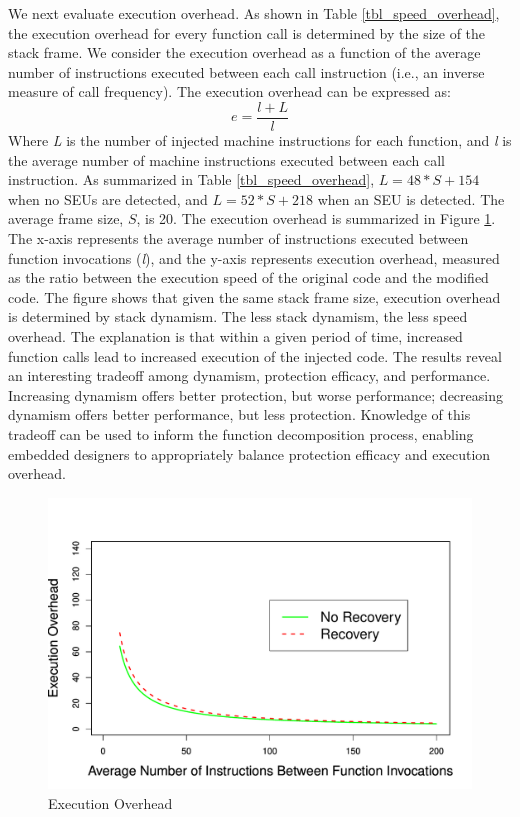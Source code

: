 We next evaluate execution overhead. As shown in Table \ref{tbl_speed_overhead}, the execution overhead for every function call is determined by the size of the stack frame. We consider the execution overhead as a function of the average number of instructions executed between each call instruction (i.e., an inverse measure of call frequency). The execution overhead can be expressed as:
\begin{equation}\label{eq_seu1}
e=\frac{l+L}{l}
\end{equation}
Where \textit{L} is the number of injected machine instructions for each function, and \textit{l} is the average number of machine instructions executed between each call instruction. As summarized in Table \ref{tbl_speed_overhead}, $L=48*S+154$ when no SEUs are detected, and $L=52*S+218$ when an SEU is detected. The average frame size, $S$, is 20. The execution overhead is summarized in Figure \ref{fig:speed_overhead}. The x-axis represents the average number of instructions executed between function invocations (\textit{l}), and the y-axis represents execution overhead, measured as the ratio between the execution speed of the original code and the modified code. The figure shows that given the same stack frame size, execution overhead is determined by stack dynamism. The less stack dynamism, the less speed overhead. The explanation is that within a given period of time, increased function calls lead to increased execution of the injected code. The results reveal an interesting tradeoff among dynamism, protection efficacy, and performance. Increasing dynamism offers better protection, but worse performance; decreasing dynamism offers better performance, but less protection. Knowledge of this tradeoff can be used to inform the function decomposition process, enabling embedded designers to appropriately balance protection efficacy and execution overhead.
\begin{figure}
\centering
\includegraphics[scale=0.4]{figures/speed_overhead_line_chart_v1.pdf}
\caption{Execution Overhead}
\vspace{-15pt}
\label{fig:speed_overhead}
\end{figure}
